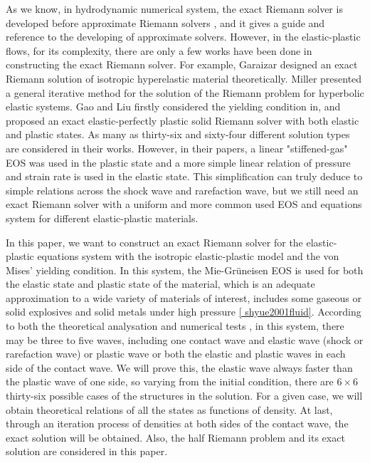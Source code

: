 \documentclass[review]{elsarticle}
\begin{document}
As we know, in hydrodynamic  numerical system, the exact Riemann solver is developed before approximate Riemann solvers \cite{godunov1959difference}, and it gives a guide and reference to the developing of approximate solvers. However, in the elastic-plastic flows, for its complexity, there are only a few works have been done in constructing the exact Riemann solver. For example, 
Garaizar \cite{garaizar1991solution} designed an exact Riemann solution of isotropic hyperelastic material theoretically.  Miller \cite{miller2004iterative} presented a general iterative method for the solution of the Riemann problem for hyperbolic elastic systems. Gao and Liu \cite{gao20171d,gao2018complete} firstly considered the yielding condition in, and proposed an exact elastic-perfectly plastic solid Riemann solver with both elastic and plastic states. As many as thirty-six \cite{gao20171d} and sixty-four \cite{gao2018complete} different solution types are considered in their works.
However, in their papers,  a linear  "stiffened-gas" EOS was used in the plastic state and a more simple linear relation of pressure and strain rate is used in the elastic state. This simplification can truly deduce to simple relations  across the shock wave and rarefaction wave, but we still need an exact Riemann solver with a uniform and more common used EOS and equations system for different elastic-plastic materials.

In this paper, we want to construct an exact Riemann solver for the elastic-plastic equations system with the  isotropic elastic-plastic model and the  von Mises' yielding condition. In this system, the Mie-Gr\"uneisen EOS is used for both the elastic state and plastic state of the material, which is an adequate approximation to a wide variety of materials of interest, includes some gaseous or solid explosives and solid metals under high pressure \ref{ shyue2001fluid}.  According to both the theoretical analysation and numerical tests \cite{xiao1996numerical}, in this system, there may be three to five waves, including one contact wave and elastic wave (shock or rarefaction wave) or plastic wave or both the elastic and plastic waves in each side of the contact wave. We will prove this, the elastic wave always faster than the plastic wave of  one side, so varying from the initial condition, there are $6\times 6$ thirty-six possible cases of the structures in the solution. For a given case, we will obtain theoretical relations of all the states as functions of density. At last,  through an iteration process of densities at both sides of the contact wave, the  exact solution will be obtained. Also, the half Riemann problem and its exact solution are considered in this paper.                        
\end{document}
